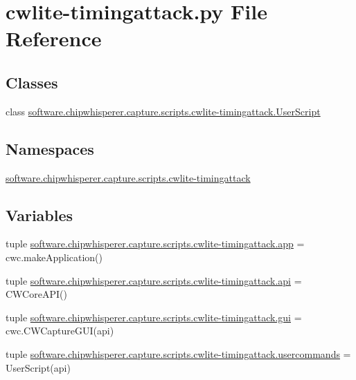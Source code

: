 \hypertarget{cwlite-timingattack_8py}{}\section{cwlite-\/timingattack.py File Reference}
\label{cwlite-timingattack_8py}
\subsection*{Classes}
\begin{DoxyCompactItemize}
\item 
class \hyperlink{classsoftware_1_1chipwhisperer_1_1capture_1_1scripts_1_1cwlite-timingattack_1_1UserScript}{software.\+chipwhisperer.\+capture.\+scripts.\+cwlite-\/timingattack.\+User\+Script}
\end{DoxyCompactItemize}
\subsection*{Namespaces}
\begin{DoxyCompactItemize}
\item 
 \hyperlink{namespacesoftware_1_1chipwhisperer_1_1capture_1_1scripts_1_1cwlite-timingattack}{software.\+chipwhisperer.\+capture.\+scripts.\+cwlite-\/timingattack}
\end{DoxyCompactItemize}
\subsection*{Variables}
\begin{DoxyCompactItemize}
\item 
tuple \hyperlink{namespacesoftware_1_1chipwhisperer_1_1capture_1_1scripts_1_1cwlite-timingattack_ac009d7cfe60653ce2dd6caf1e06df1f5}{software.\+chipwhisperer.\+capture.\+scripts.\+cwlite-\/timingattack.\+app} = cwc.\+make\+Application()
\item 
tuple \hyperlink{namespacesoftware_1_1chipwhisperer_1_1capture_1_1scripts_1_1cwlite-timingattack_a452abda888c34b0cc5d5684b00602f9e}{software.\+chipwhisperer.\+capture.\+scripts.\+cwlite-\/timingattack.\+api} = C\+W\+Core\+A\+P\+I()
\item 
tuple \hyperlink{namespacesoftware_1_1chipwhisperer_1_1capture_1_1scripts_1_1cwlite-timingattack_a2fc88bd3660927f0a48ecb252342b44b}{software.\+chipwhisperer.\+capture.\+scripts.\+cwlite-\/timingattack.\+gui} = cwc.\+C\+W\+Capture\+G\+U\+I(api)
\item 
tuple \hyperlink{namespacesoftware_1_1chipwhisperer_1_1capture_1_1scripts_1_1cwlite-timingattack_a4e087fe66d38c06cb1a228828d83213a}{software.\+chipwhisperer.\+capture.\+scripts.\+cwlite-\/timingattack.\+usercommands} = User\+Script(api)
\end{DoxyCompactItemize}
